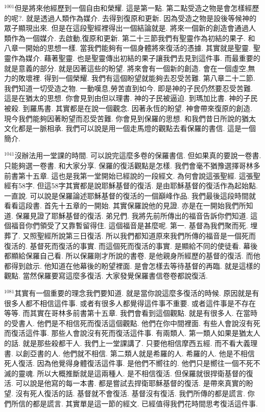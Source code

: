 \documentclass{book}
\begin{document}
$^{1001}$但是將來他經歷到一個自由和榮耀.
這是第一點.
第二點受造之物是會怎樣經歷的呢?.
就是透過人類作為媒介.
去得到復原和更新.
因為受造之物是設後等候神的眾子顯現出來.
但是在這段聖經裡得出一個結論就是.
將來一個新的創造會通過人類作為一個媒介.
去啟動,復原和更新.
第二十三節我們有聖靈作為初結的果子.
和八章一開始的思想一樣.
當我們能夠有一個身體將來復活的憑據.
其實就是聖靈.
聖靈作為媒介.
藉著聖靈.
也是聖靈傳出初結的果子讓我們去見到這件事.
而最重要的就是意義的部分.
就是因著這些的盼望.
將來會有一個新的創造.
會在一個虛空,無力的敗壞裡.
得到一個榮耀.
我們有這個盼望就能夠去忍受苦難.
第八章二十二節.
我們知道一切受造之物.
一動嘆息,勞苦直到如今.
即是神的子民仍然要忍受苦難.
這是在猶太的思想.
你會見到由但以理書.
神的子民被逼迫.
到瑪加比書.
神的子民被殺.
到羅馬書.
其實都是在說一個觀念.
因著永恆的盼望.
神會帶來復原的創造.
現今我們能夠因著盼望而忍受苦難.
你會見到保羅的思想.
和我們昔日所說的猶太文化都是一脈相承.
我們可以說是用一個走馬燈的觀點去看保羅的書信.
這是一個簡介.

$^{1041}$沒辦法用一堂課的時間.
可以說完這麼多卷的保羅書信.
但如果真的要說一卷書.
只能夠選一卷書.
和大家分享.
保羅的復活觀點是怎樣.
我們會毫不猶豫選擇哥林多前書第十五章.
這也是我第一堂開始已經說的一段經文.
為何會說這張聖經.
這張聖經有58字.
但這58字其實都是說耶穌基督的復活.
是由耶穌基督的復活作為起始點.
一直說.
可以說是保羅論述耶穌基督的復活的一個巔峰作品.
我們最後這段時間就看看這段書.
首先十五章的一開始.
其實保羅說他的見證.
亦是在一開始我們所知道.
保羅見證了耶穌基督的復活.
弟兄們.
我將先前所傳出的福音告訴你們知道.
這個福音你們領受了又靠暫留得住.
這個福音是甚麼呢.
第一.
基督為我們聚而死.
埋葬了.
又照聖經所說第三日復活.
所以我們都知道原來我們所傳的福音是一個死而復活的.
基督死而復活的事實.
而這個死而復活的事實.
是顯給不同的使徒看.
幕後都顯給保羅自己看.
所以保羅剛才所說的書卷.
是他親身所經歷的基督的復活.
而他都得到啟示.
他知道在他幕後的盼望裡面.
是會怎樣去等待基督的再臨.
就是這樣的觀點.
當然保羅要寫這麼多復活.
大家發覺保羅書信卷卷都說復活.

$^{1081}$其實有一個重要的理念我們要知道.
就是當你說這麼多復活的時候.
原因就是有很多人都不相信這件事.
或者有很多人都覺得這件事不重要.
或者這件事是不存在等等.
而其實在哥林多前書第十五章.
我們會看到這個觀點.
就是有很多人.
在當時的受書人.
他們是不相信死而復活這個觀點.
他們在你中間裡面.
有些人會說沒有死而復活這件事.
那些人會說沒有死而復活這件事.
有兩類人.
第一類人如果是猶太人的話.
就是那些殺都干人.
我們上一堂課講了.
只要他相信摩西五經.
而不看大義理書.
以創亞書的人.
他們就不相信.
第二類人就是希羅的人.
希羅的人.
他是不相信死人復活.
因為他覺得身體復活這件事.
是他們不嚮往的.
他們只是嚮往一個不死不滅的靈魂.
所以大概推斷就是這兩種人.
是不相信復活.
但保羅就很捍衛基督的復活.
可以說是他寫的每一本書.
都是嘗試去捍衛耶穌基督的復活.
是帶來真實的盼望.
沒有死人復活的話.
基督就不會復活.
基督沒有復活.
我們所傳的都是謊言.
你們所信的都是謊言.
其實單是這一節的經文.
已經值得我們花時間思考復活這件事.
\end{document}
